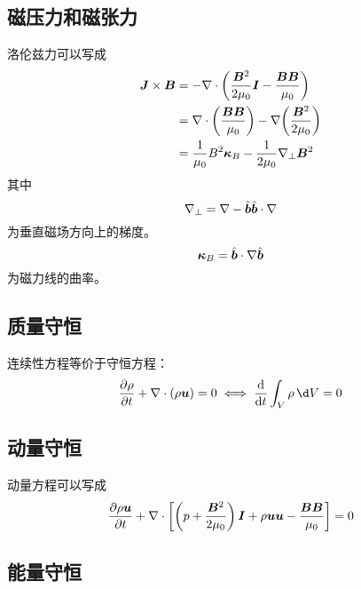 \subsection{磁压力和磁张力}

洛伦兹力可以写成
\begin{equation}\begin{aligned}
    \bm{J} \times \bm{B} &= - \nabla \cdot {\left(
    \frac{\bm{B}^2}{2 \mu_0} \bm{I} - \frac{\bm{B}\bm{B}}{\mu_0}
\right)} \\
&= \nabla \cdot {\left(\frac{\bm{B}\bm{B}}{\mu_0}\right)}
- \nabla {\left(\frac{\bm{B}^2}{2 \mu_0}\right)} \\
&= \frac{1}{\mu_0} B^2 \bm{\kappa}_B
- \frac{1}{2 \mu_0} \nabla_\perp \bm{B}^2
\end{aligned}\end{equation}
其中
\begin{equation}
\nabla_\perp = \nabla - \hat{\bm{b}} \hat{\bm{b}} \cdot \nabla
\end{equation}
为垂直磁场方向上的梯度。
\begin{equation}
\bm{\kappa}_B = \hat{\bm{b}} \cdot \nabla {\hat{\bm{b}}}
\end{equation}
为磁力线的曲率。

\subsection{质量守恒}

连续性方程等价于守恒方程：
\begin{equation}
    \pDeriv{\rho}{t} + \dive{\left(\rho \vector{u}\right)} = 0
\iff\Deriv{}{t} \int_V \rho \, \d V = 0
\end{equation}

\subsection{动量守恒}

动量方程可以写成
\begin{equation}
\frac{\partial {\rho \bm{u}}}{\partial {t}} + \nabla \cdot {\left[
    \left(p + \frac{\bm{B}^2}{2 \mu_0}\right) \bm{I}
    + \rho \bm{u} \bm{u}
    - \frac{\bm{B} \bm{B}}{\mu_0}
\right]} = 0
\end{equation}

\subsection{能量守恒}

